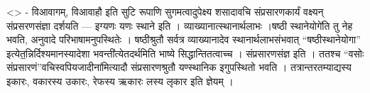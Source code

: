 \textless{}\textgreater{} - विआवागम्, विआवाहौ इति सुटि रूपाणि
सुगमत्वादुपेक्ष्य शसादावचि संप्रसारणकार्यं वक्ष्यन् संप्रसरणसंज्ञा
दर्शयति --- इग्यणः यणः स्थाने इति । व्याख्यानात्स्थानार्थलाभः ।षष्ठी
स्थानेयोगे॑ति तु नेह भवति, अनुवादे परिभाषामनुपस्थितेः । षष्ठीश्रुतौ
सर्वत्र व्याख्यानादेव स्थानार्थलाभसंभवात् ``षष्ठीस्थानेयोगा''
इत्येत॒न्निर्दिश्यमानस्यादेशा भवन्ती॑त्येतदर्थमिति भाष्ये
सिद्धान्तितत्वाच्च । संप्रसारणसंज्ञ इति । ततश्च ``वसोः
संप्रसारणं''वचिस्वपियजादीना॑मित्यादौ संप्रसारणश्रुतौ यण्स्थानिक
इगुपस्थितो भवति । तत्रान्तरतम्याद्यस्य इकारः, वकारस्य उकारः, रेफस्य
ऋकारः लस्य लृकार इति ज्ञेयम् ।
